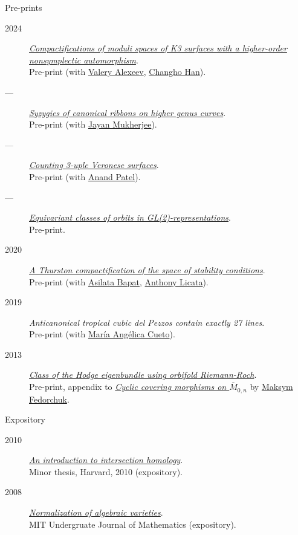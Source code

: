 \documentclass[11pt]{article}
\begin{document}
\begin{description}
\item[{Pre-prints}] 
\end{description}
\label{org55cec5b}
\begin{description}
\item[{2024}] \emph{\href{papers/k3z3.pdf}{Compactifications of moduli spaces of K3 surfaces with a higher-order nonsymplectic automorphism}}.\\
Pre-print (with \href{https://www.math.uga.edu/directory/people/valery-alexeev}{Valery Alexeev}, \href{https://sites.google.com/view/changho-han/}{Changho Han}).
\item[{---}] \emph{\href{papers/highergenusribbons.pdf}{Syzygies of canonical ribbons on higher genus curves}}.\\
Pre-print (with \href{https://sites.google.com/view/mukherjeejayan}{Jayan Mukherjee}).
\item[{---}] \emph{\href{papers/3veroneseP2.pdf}{Counting 3-uple Veronese surfaces}}.\\
Pre-print (with \href{https://sites.google.com/view/anand-patel}{Anand Patel}).
\item[{---}] \emph{\href{papers/gl2orbits.pdf}{Equivariant classes of orbits in GL(2)-representations}}.\\
Pre-print.
\item[{2020}] \emph{\href{papers/a2-compactification.pdf}{A Thurston compactification of the space of stability conditions}}.\\
Pre-print (with \href{https://asilata.org/}{Asilata Bapat}, \href{https://maths-people.anu.edu.au/\~licatat/}{Anthony Licata}).
\item[{2019}] \emph{Anticanonical tropical cubic del Pezzos contain exactly 27 lines}.\\
Pre-print (with \href{https://people.math.osu.edu/cueto.5/}{María Angélica Cueto}).
\item[{2013}] \emph{\href{papers/CyclicAppendix.pdf}{Class of the Hodge eigenbundle using orbifold Riemann-Roch}}.\\
Pre-print, appendix to \href{https://drive.google.com/file/d/1wq-Fh3DiqODc51t-J0phIexVF7B4lxsY/view}{\emph{Cyclic covering morphisms on \(\overline M_{0,n}\)}} by \href{https://www2.bc.edu/maksym-fedorchuk/}{Maksym Fedorchuk}.
\end{description}

\begin{description}
\item[{Expository}] 
\end{description}
\label{orga8130fe}
\begin{description}
\item[{2010}] \emph{\href{papers/anandrd\_minor\_thesis.pdf}{An introduction to intersection homology}}.\\
Minor thesis, Harvard, 2010 (expository).
\item[{2008}] \emph{\href{papers/anandrd\_ug\_thesis.pdf}{Normalization of algebraic varieties}}.\\
MIT Undergruate Journal of Mathematics (expository).
\end{description}
\end{document}
